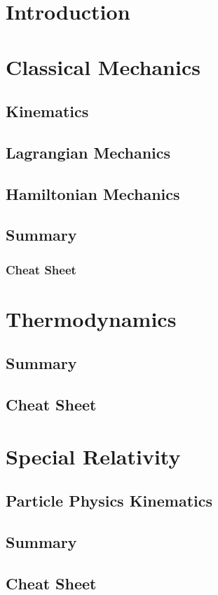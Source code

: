 \documentclass[12pt]{book}
\begin{document}
\chapter{Introduction}

\chapter{Classical Mechanics}
\section{Kinematics}
\section{Lagrangian Mechanics}
\section{Hamiltonian Mechanics}
\section{Summary}
\subsection{Cheat Sheet}

\chapter{Thermodynamics}
\section{Summary}
\section{Cheat Sheet}

\chapter{Special Relativity}
\section{Particle Physics Kinematics}
\section{Summary}
\section{Cheat Sheet}
\end{document}
